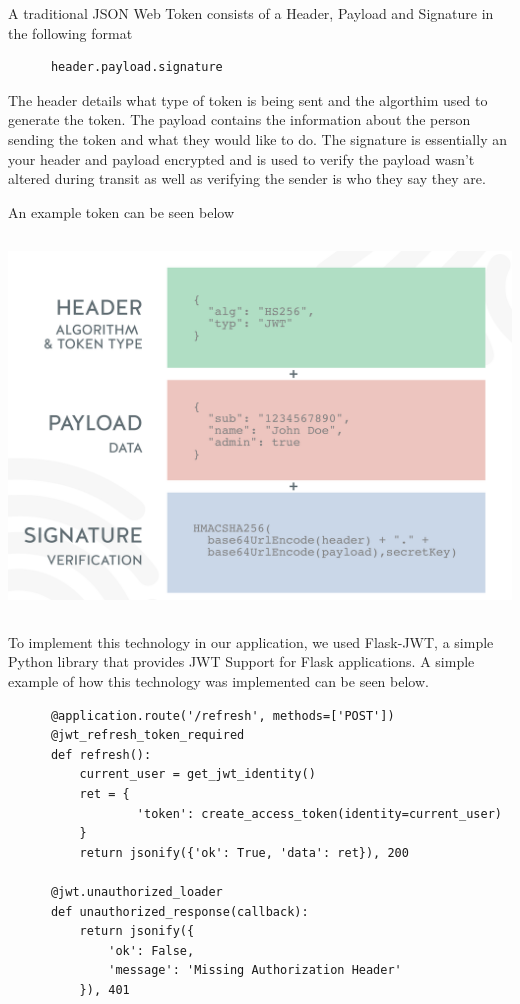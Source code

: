    A traditional JSON Web Token consists of a Header, Payload and Signature in the following format 

    \begin{verbatim}
      header.payload.signature
    \end{verbatim}

    The header details what type of token is being sent and the algorthim used to generate the token.
    The payload contains the information about the person sending the token and what they would like to do.
    The signature is essentially an your header and payload encrypted and is used to verify the payload wasn't altered during transit as well as verifying the sender is who they say they are.
    
    An example token can be seen below

    \begin{center}    
      \includegraphics[width=15cm, height=10cm]{img/JWTTokens.png}
    \end{center}

    To implement this technology in our application, we used Flask-JWT, a simple Python library that provides JWT Support for Flask applications.
    A simple example of how this technology was implemented can be seen below.

   
    \begin{verbatim}
      @application.route('/refresh', methods=['POST'])
      @jwt_refresh_token_required
      def refresh():
          current_user = get_jwt_identity()
          ret = {
                  'token': create_access_token(identity=current_user)
          }
          return jsonify({'ok': True, 'data': ret}), 200
      
      @jwt.unauthorized_loader
      def unauthorized_response(callback):
          return jsonify({
              'ok': False,
              'message': 'Missing Authorization Header'
          }), 401
    \end{verbatim}

